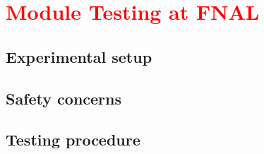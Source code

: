 \section{\textcolor{red}{Module Testing at FNAL}}
\label{s:testing}


\subsection{Experimental setup}
\label{ss:setup}

\subsection{Safety concerns}
\label{ss:safety}

\subsection{Testing procedure}
\label{ss:procedure}

